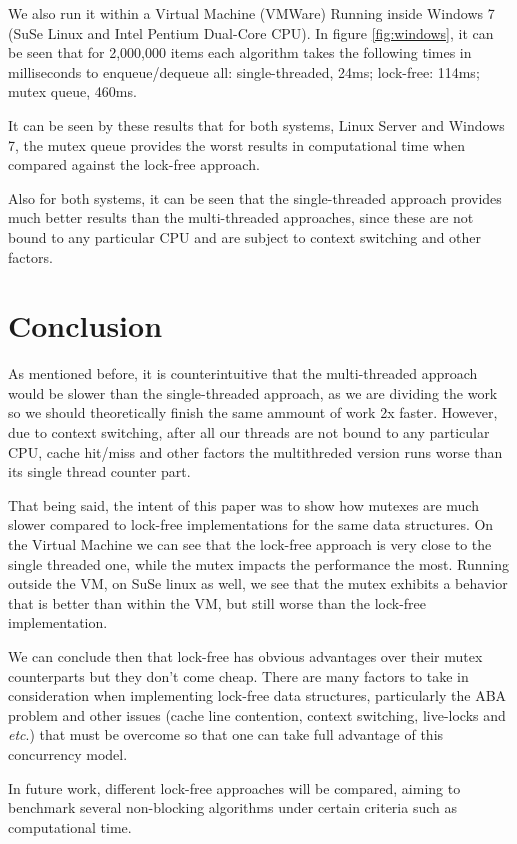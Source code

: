 \documentclass{article}
\begin{document}
We also run it within a Virtual Machine (VMWare) Running inside Windows 7 (SuSe Linux and Intel Pentium Dual-Core CPU). In figure \ref{fig:windows}, it can be seen that for 2,000,000 items each algorithm takes the following times in milliseconds to enqueue/dequeue all:	single-threaded, 24ms; lock-free: 114ms; mutex queue, 460ms.

It can be seen by these results that for both systems, Linux Server and Windows 7, the mutex queue provides the worst results in computational time when compared against the lock-free approach.

Also for both systems, it can be seen that the single-threaded approach provides much better results than the multi-threaded approaches, since these are not bound to any particular CPU and are subject to context switching and other factors.

\section{Conclusion}
\label{sec:conclusion}

As mentioned before, it is counterintuitive that the multi-threaded approach would be slower than the single-threaded approach, as we are dividing the work so we should theoretically finish the same ammount of work 2x faster. However, due to context switching, after all our threads are not bound to any particular CPU, cache hit/miss and other factors the multithreded version runs worse than its single thread counter part.

That being said, the intent of this paper was to show how mutexes are much slower compared to lock-free implementations for the same data structures. On the Virtual Machine we can see that the lock-free approach is very close to the single threaded one, while the mutex impacts the performance the most. Running outside the VM, on SuSe linux as well, we see that the mutex exhibits a behavior that is better than within the VM, but still worse than the lock-free implementation.

We can conclude then that lock-free has obvious advantages over their mutex counterparts but they don't come cheap. There are many factors to take in consideration when implementing lock-free data structures, particularly the ABA problem and other issues (cache line contention, context switching, live-locks and \textit{etc}.) that must be overcome so that one can take full advantage of this concurrency model.

In future work, different lock-free approaches will be compared, aiming to benchmark several non-blocking algorithms under certain criteria such as computational time.
\end{document}
